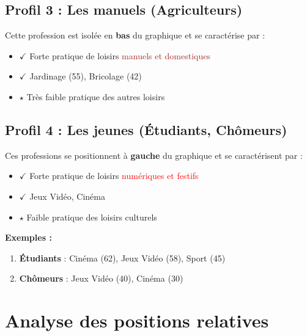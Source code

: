 \documentclass[12pt,a4paper]{book}
\begin{document}
	\subsection{Profil 3 : Les manuels (Agriculteurs)}
	
	Cette profession est isolée en \textbf{bas} du graphique et se caractérise par :
	
	\begin{itemize}
		\item $\checkmark$ Forte pratique de loisirs \textcolor{brown}{manuels et domestiques}
		\item $\checkmark$ Jardinage (55), Bricolage (42)
		\item $\star$ Très faible pratique des autres loisirs
	\end{itemize}
	
	\subsection{Profil 4 : Les jeunes (Étudiants, Chômeurs)}
	
	Ces professions se positionnent à \textbf{gauche} du graphique et se caractérisent par :
	
	\begin{itemize}
		\item $\checkmark$ Forte pratique de loisirs \textcolor{red}{numériques et festifs}
		\item $\checkmark$ Jeux Vidéo, Cinéma
		\item $\star$ Faible pratique des loisirs culturels
	\end{itemize}
	
	\textbf{Exemples :}
	\begin{enumerate}
		\item \textbf{Étudiants} : Cinéma (62), Jeux Vidéo (58), Sport (45)
		\item \textbf{Chômeurs} : Jeux Vidéo (40), Cinéma (30)
	\end{enumerate}
	
	\section{Analyse des positions relatives}
	
\end{document}
